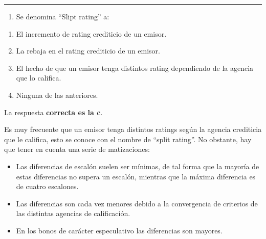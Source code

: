 \documentclass[
  letterpaper,
  DIV=11,
  numbers=noendperiod]{scrreprt}
\providecommand{\tightlist}{%
  \setlength{\itemsep}{0pt}\setlength{\parskip}{0pt}}\usepackage{longtable,booktabs,array}
\begin{document}
\begin{center}\rule{0.5\linewidth}{0.5pt}\end{center}

\begin{enumerate}
\def\labelenumi{\arabic{enumi}.}
\setcounter{enumi}{70}
\tightlist
\item
  Se denomina ``Slipt rating'' a:
\end{enumerate}

\begin{enumerate}
\def\labelenumi{\alph{enumi})}
\item
  El incremento de rating crediticio de un emisor.
\item
  La rebaja en el rating crediticio de un emisor.
\item
  El hecho de que un emisor tenga distintos rating dependiendo de la
  agencia que lo califica.
\item
  Ninguna de las anteriores.
\end{enumerate}

\begin{tcolorbox}[enhanced jigsaw, left=2mm, opacityback=0, colback=white, breakable, arc=.35mm, bottomrule=.15mm, rightrule=.15mm, toprule=.15mm, leftrule=.75mm, colframe=quarto-callout-tip-color-frame]
\begin{minipage}[t]{5.5mm}
\textcolor{quarto-callout-tip-color}{\faLightbulb}
\end{minipage}%
\begin{minipage}[t]{\textwidth - 5.5mm}

La respuesta \textbf{correcta es la c}.

Es muy frecuente que un emisor tenga distintos ratings según la agencia
crediticia que le califica, esto se conoce con el nombre de ``split
rating''. No obstante, hay que tener en cuenta una serie de
matizaciones:

\begin{itemize}
\item
  Las diferencias de escalón suelen ser mínimas, de tal forma que la
  mayoría de estas diferencias no supera un escalón, mientras que la
  máxima diferencia es de cuatro escalones.
\item
  Las diferencias son cada vez menores debido a la convergencia de
  criterios de las distintas agencias de calificación.
\item
  En los bonos de carácter especulativo las diferencias son mayores.
\end{itemize}

\end{minipage}%
\end{tcolorbox}
\end{document}
